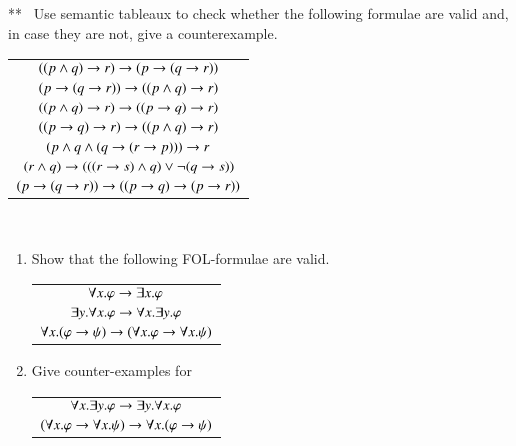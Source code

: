 \begin{question}** \
Use semantic tableaux to check whether the following formulae are valid
and, in case they are not, give a counterexample.
\begin{center}
\begin{tabular}{c}
$((p\wedge q)\rightarrow r) \rightarrow (p\rightarrow (q\rightarrow r))$\\ %
$(p\rightarrow (q\rightarrow r))\rightarrow ((p\wedge q)\rightarrow r)$\\  %
$((p\wedge q)\rightarrow r) \rightarrow ((p\rightarrow q)\rightarrow r)$\\ %
$((p\rightarrow q)\rightarrow r)\rightarrow ((p\wedge q)\rightarrow r)$\\  %
$(p\wedge q \wedge (q\rightarrow( r\rightarrow p)))\rightarrow r$\\ %
$(r\wedge q) \rightarrow (((r\rightarrow s)\wedge q) \vee \neg(q\rightarrow s))$ \\ %
$(p\rightarrow (q\rightarrow r))\rightarrow((p\rightarrow q)\rightarrow (p\rightarrow r))$ \\%
\end{tabular}
\end{center}
\end{question}


\begin{question} \ \label{qn:traffic-light-tableau} 
\begin{enumerate}
\item
Show that the following FOL-formulae are valid.
\begin{center}
\begin{tabular}{c}
$\forall x.\varphi \rightarrow \exists x.\varphi$\\
$\exists y.\forall x.\varphi\rightarrow \forall x.\exists y. \varphi$\\
$\forall x.(\varphi\rightarrow \psi) \rightarrow(\forall x. \varphi \rightarrow \forall x. \psi)$\\
\end{tabular}
\end{center}
\item
Give counter-examples for 
\begin{center}
\begin{tabular}{c}
$\forall x.\exists y. \varphi \rightarrow \exists y.\forall x.\varphi$\\
$(\forall x. \varphi \rightarrow \forall x. \psi) \rightarrow \forall x. (\varphi\rightarrow \psi) $\\
\end{tabular}
\end{center}
\end{enumerate}
\end{question}

